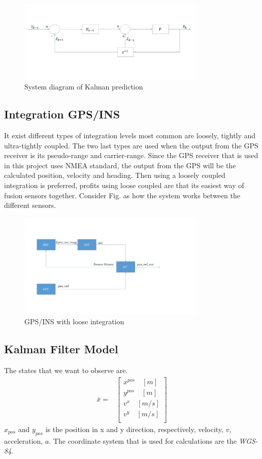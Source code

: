 \begin{figure}[H]
\centering
\includegraphics[width=0.8\textwidth]{Bild1.JPG}
\caption{System diagram of Kalman prediction}
\label{kalman_system}
\end{figure}

\subsection*{Integration GPS/INS}
It exist different types of integration levels most common are loosely, tightly and ultra-tightly coupled. The two last types are used when the output from the GPS receiver is its pseudo-range and carrier-range. Since the GPS receiver that is used in this project uses NMEA standard, the output from the GPS will be the calculated position, velocity and heading. Then using a loosely coupled integration is preferred, profits using loose coupled are that its easiest way of fusion sensors together. Consider Fig. as how the system works between the different sensors.

\begin{figure}[H]
\centering
\includegraphics[width=0.8\textwidth]{loose_coup.JPG}
\caption{GPS/INS with loose integration}
\label{kalman_system}
\end{figure}

\subsection*{Kalman Filter Model}
The states that we want to observe are.
\begin{align}
\bar{x}=&
\begin{bmatrix}
x^{pos}\quad[m]\\
y^{pos}\quad[m]\\
v^{x}\quad[m/s]\\
v^{y}\quad[m/s]\\
\end{bmatrix}
\end{align}
$x_{pos}$ and $y_{pos}$ is the position in x and y direction, respectively, velocity, $v$, acceleration, $a$. The coordinate system that is used for calculations are the \emph{WGS-84}.

